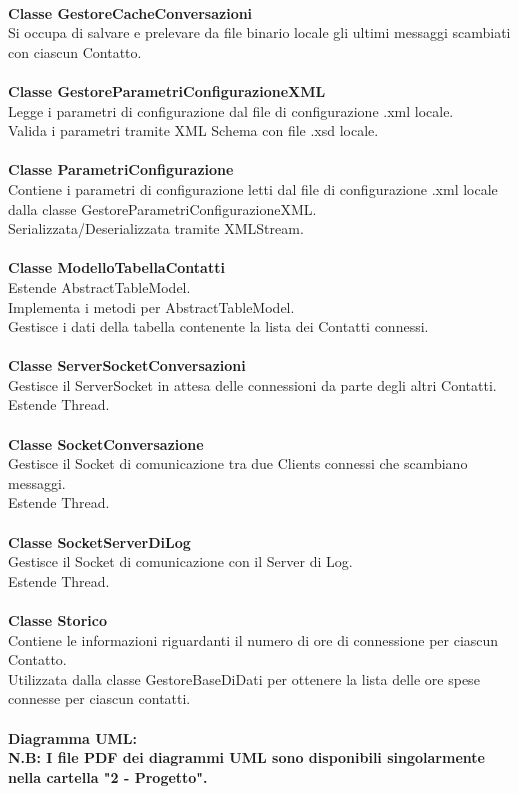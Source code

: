 \documentclass[a4paper, 11pt]{article} %
\begin{document}
\\
\textbf{Classe GestoreCacheConversazioni}\\
Si occupa di salvare e prelevare da file binario locale gli ultimi messaggi scambiati con ciascun Contatto.\\
\\
\textbf{Classe GestoreParametriConfigurazioneXML}\\
Legge i parametri di configurazione dal file di configurazione .xml locale.\\
Valida i parametri tramite XML Schema con file .xsd locale.\\
\\
\textbf{Classe ParametriConfigurazione}\\
Contiene i parametri di configurazione letti dal file di configurazione .xml locale dalla classe GestoreParametriConfigurazioneXML.\\
Serializzata/Deserializzata tramite XMLStream.\\
\\
\textbf{Classe ModelloTabellaContatti}\\
Estende AbstractTableModel.\\
Implementa i metodi per AbstractTableModel.\\
Gestisce i dati della tabella contenente la lista dei Contatti connessi.\\
\\
\textbf{Classe ServerSocketConversazioni}\\
Gestisce il ServerSocket in attesa delle connessioni da parte degli altri Contatti.\\
Estende Thread.\\
\\
\textbf{Classe SocketConversazione}\\
Gestisce il Socket di comunicazione tra due Clients connessi che scambiano messaggi.\\
Estende Thread.\\
\\
\textbf{Classe SocketServerDiLog}\\
Gestisce il Socket di comunicazione con il Server di Log.\\
Estende Thread.\\
\\
\textbf{Classe Storico}\\
Contiene le informazioni riguardanti il numero di ore di connessione per ciascun Contatto.\\
Utilizzata dalla classe GestoreBaseDiDati per ottenere la lista delle ore spese connesse per ciascun contatti.\\
\\
\textbf{Diagramma UML:}\\
\textbf{N.B: I file PDF dei diagrammi UML sono disponibili singolarmente nella cartella "2 - Progetto".}
\clearpage

\end{document}
